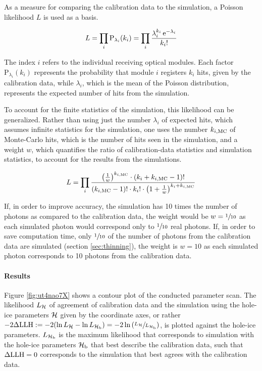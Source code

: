 As a measure for comparing the calibration data to the simulation, a
Poisson likelihood \(L\) is used as a basis.

\begin{equation}
  L = \prod_{i} \text{P}_{\lambda_i}(k_i) = \prod_{i} \frac{\lambda_i^{k_i}\,\mathrm{e}^{-\lambda_i}}{k_i !}
\end{equation}

The index \(i\) refers to the individual receiving optical modules. Each
factor \(\text{P}_{\lambda_i}(k_i)\) represents the probability that
module \(i\) registers \(k_i\) hits, given by the calibration data,
while \(\lambda_i\), which is the mean of the Poisson distribution,
represents the expected number of hits from the simulation.

To account for the finite statistics of the simulation, this likelihood
can be generalized. Rather than using just the number \(\lambda_i\) of
expected hits, which assumes infinite statistics for the simulation, one
uses the number \(k_{i,\text{MC}}\) of Monte-Carlo hits, which is the number of
hits seen in the simulation, and a weight \(w\), which quantifies the
ratio of calibration-data statistics and simulation statistics, to
account for the results from the simulations.
\cite[equation 21]{Gluesenkamp2018}

\begin{equation}
  L = \prod_{i} \frac%
    {\left(\frac{1}{w}\right)^{k\imc} \cdot \left(k_i + k\imc - 1\right)!}%
    {(k\imc - 1)! \cdot k_i! \cdot \left( 1 + \frac{1}{w} \right)^{k_i + k\imc}}
\end{equation}

If, in order to improve accuracy, the simulation has 10 times the number
of photons as compared to the calibration data, the weight would be
\(w=\sfrac{1}{10}\) as each simulated photon would correspond only to
\(\sfrac{1}{10}\) real photons. If, in order to save computation time,
only \(\sfrac{1}{10}\) of the number of photons from the calibration
data are simulated (section \ref{sec:thinning}), the weight is \(w=10\)
as each simulated photon corresponds to 10 photons from the calibration
data.

\paragraph{Results}

Figure \ref{fig:ut4nao7X} shows a contour plot of the conducted
parameter scan. The likelihood \(L_{\mathcal{H}}\) of agreement of calibration
data and the simulation using the hole-ice parameters \(\mathcal{H}\) given by
the coordinate axes, or rather
\(-2\Delta\text{LLH}:= -2(\ln L_{\mathcal{H}} - \ln L_{\mathcal{H}_\text{b}}) = -2 \ln \left(\sfrac{L_{\mathcal{H}}}{L_{\mathcal{H}_\text{b}}}\right)\),
is plotted against the hole-ice parameters. \(L_{\mathcal{H}_\text{b}}\) is the maximum
likelihood that corresponds to simulation with the hole-ice parameters
\({\mathcal{H}_\text{b}}\) that best describe the calibration data, such that
\(\Delta\text{LLH} = 0\) corresponds to the simulation that best agrees with
the calibration data.


